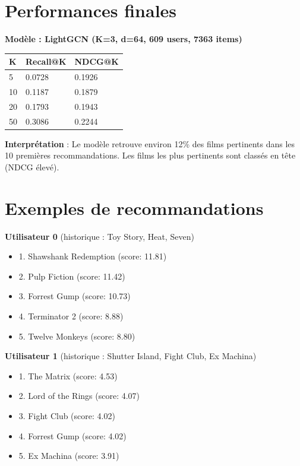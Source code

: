 \documentclass[12pt,a4paper]{report}
\begin{document}
\section{Performances finales}

\begin{center}
\begin{tcolorbox}[colback=green!10,colframe=DGreen,arc=3pt,boxrule=1pt]
\textbf{Modèle : LightGCN (K=3, d=64, 609 users, 7363 items)}

\vspace{0.3cm}

\begin{tabular}{lll}
\toprule
\textbf{K} & \textbf{Recall@K} & \textbf{NDCG@K} \\
\midrule
5 & 0.0728 & 0.1926 \\
10 & 0.1187 & 0.1879 \\
20 & 0.1793 & 0.1943 \\
50 & 0.3086 & 0.2244 \\
\bottomrule
\end{tabular}
\end{tcolorbox}
\end{center}

\textbf{Interprétation} : Le modèle retrouve environ 12\% des films pertinents
dans les 10 premières recommandations. Les films les plus pertinents sont
classés en tête (NDCG élevé).

\section{Exemples de recommandations}

\textbf{Utilisateur 0} (historique : Toy Story, Heat, Seven)

\begin{itemize}
  \item 1. Shawshank Redemption (score: 11.81)
  \item 2. Pulp Fiction (score: 11.42)
  \item 3. Forrest Gump (score: 10.73)
  \item 4. Terminator 2 (score: 8.88)
  \item 5. Twelve Monkeys (score: 8.80)
\end{itemize}

\textbf{Utilisateur 1} (historique : Shutter Island, Fight Club, Ex Machina)

\begin{itemize}
  \item 1. The Matrix (score: 4.53)
  \item 2. Lord of the Rings (score: 4.07)
  \item 3. Fight Club (score: 4.02)
  \item 4. Forrest Gump (score: 4.02)
  \item 5. Ex Machina (score: 3.91)
\end{itemize}
\end{document}
